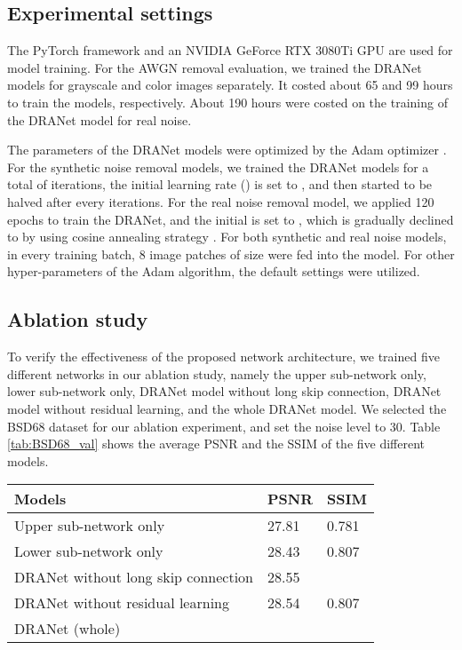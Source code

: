 \documentclass[3p,times]{elsarticle}
\begin{document}
\subsection{Experimental settings}
The PyTorch framework and an NVIDIA GeForce RTX 3080Ti GPU are used for model training. For the AWGN removal evaluation, we trained the DRANet models for grayscale and color images separately. It costed about 65 and 99 hours to train the models, respectively. About 190 hours were costed on the training of the DRANet model for real noise.

The parameters of the DRANet models were optimized by the Adam optimizer \cite{Kingma2014}. For the synthetic noise removal models, we trained the DRANet models for a total of  iterations, the initial learning rate () is set to , and then started to be halved after every  iterations. For the real noise removal model, we applied 120 epochs to train the DRANet, and the initial  is set to , which is gradually declined to  by using cosine annealing strategy \cite{Loshchilov2017}. For both synthetic and real noise models, in every training batch, 8 image patches of size  were fed into the model. For other hyper-parameters of the Adam algorithm, the default settings were utilized.

\subsection{Ablation study}
To verify the effectiveness of the proposed network architecture, we trained five different networks in our ablation study, namely the upper sub-network only, lower sub-network only, DRANet model without long skip connection, DRANet model without residual learning, and the whole DRANet model. We selected the BSD68 dataset \cite{Roth2005} for our ablation experiment, and set the noise level to 30. Table \ref{tab:BSD68_val} shows the average PSNR and the SSIM \cite{Wang2004} of the five different models.

\begin{table*}[htbp]
\centering
\caption{Quantitative results (PSNR) for the AWGN removal evaluation. The best result are bolded.}
\label{tab:BSD68_val}
\begin{tabular}{lll}
\hline
Models & PSNR & SSIM\\
\hline
Upper sub-network only& 27.81 & 0.781\\
\hline
Lower sub-network only& 28.43 & 0.807\\
\hline
DRANet without long skip connection & 28.55 & \\
\hline
DRANet without residual learning & 28.54 & 0.807\\
\hline
DRANet (whole) &  & \\
\hline
\end{tabular}
\end{table*}
\end{document}
